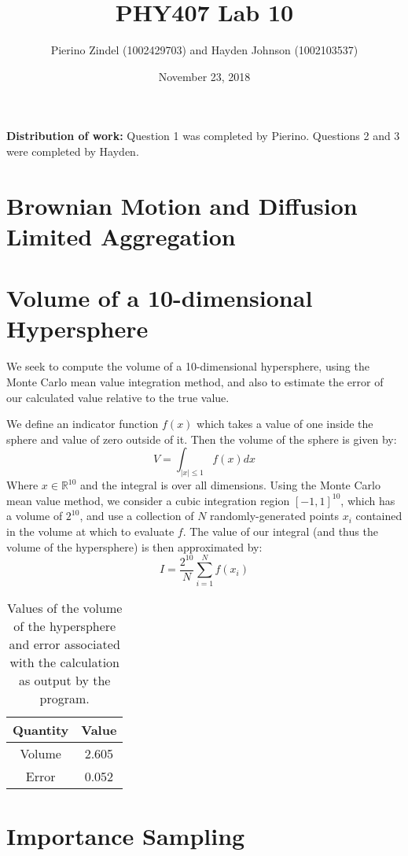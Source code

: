 \documentclass{article}
\title{PHY407 Lab 10}
\author{Pierino Zindel (1002429703) and Hayden Johnson (1002103537)}
\date{November 23, 2018}
\begin{document}
\maketitle

\noindent \textbf{Distribution of work:} Question 1 was completed by Pierino. Questions 2 and 3 were completed by Hayden.

\section{Brownian Motion and Diffusion Limited Aggregation}

\section{Volume of a 10-dimensional Hypersphere}

We seek to compute the volume of a 10-dimensional hypersphere, using the Monte Carlo mean value integration method, and also to estimate the error of our calculated value relative to the true value.

We define an indicator function $f(x)$ which takes a value of one inside the sphere and value of zero outside of it. Then the volume of the sphere is given by:
\begin{equation}
	V = \int_{|x|\leq 1}f(x) dx
\end{equation}
Where $x \in \mathbb{R}^{10}$ and the integral is over all dimensions. Using the Monte Carlo mean value method, we consider a cubic integration region $[-1,1]^10$, which has a volume of $2^10$, and use a collection of $N$ randomly-generated points $x_i$ contained in the volume at which to evaluate $f$. The value of our integral (and thus the volume of the hypersphere) is then approximated by:
\begin{equation}
	I = \frac{2^{10}}{N}\sum_{i=1}^N f(x_i)
\end{equation}


\begin{table}[H]
	\centering
	\caption{Values of the volume of the hypersphere and error associated with the calculation as output by the program.}
	\label{tab:q2}
	\begin{tabular}{c|c}
		Quantity & Value \\
		\hline
		Volume & 2.605 \\
		Error & 0.052
	\end{tabular}
\end{table}

\section{Importance Sampling}
\end{document}
